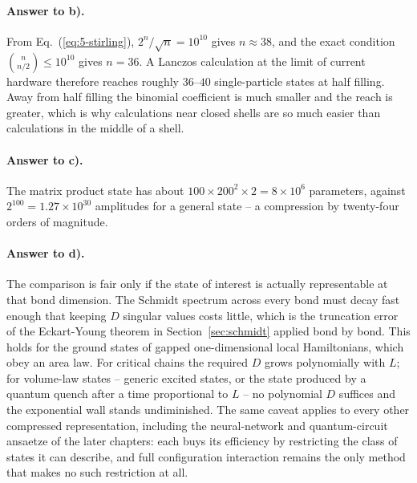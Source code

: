 \paragraph{Answer to b).}
From Eq.~(\ref{eq:5-stirling}), $2^{n}/\sqrt{n}=10^{10}$ gives $n\approx38$,
and the exact condition $\binom{n}{n/2}\le10^{10}$ gives $n=36$.  A Lanczos
calculation at the limit of current hardware therefore reaches roughly
$36$--$40$ single-particle states at half filling.  Away from half filling the
binomial coefficient is much smaller and the reach is greater, which is why
calculations near closed shells are so much easier than calculations in the
middle of a shell.

\paragraph{Answer to c).}
The matrix product state has about $100\times200^2\times2=8\times10^{6}$
parameters, against $2^{100}=1.27\times10^{30}$ amplitudes for a general
state -- a compression by twenty-four orders of magnitude.

\paragraph{Answer to d).}
The comparison is fair only if the state of interest is actually representable
at that bond dimension.  The Schmidt spectrum across every bond must decay
fast enough that keeping $D$ singular values costs little, which is the
truncation error of the Eckart-Young theorem in
Section~\ref{sec:schmidt} applied bond by bond.  This holds for the ground
states of gapped one-dimensional local Hamiltonians, which obey an area law.
For critical chains the required $D$ grows polynomially with $L$; for
volume-law states -- generic excited states, or the state produced by a
quantum quench after a time proportional to $L$ -- no polynomial $D$
suffices and the exponential wall stands undiminished.  The same caveat
applies to every other compressed representation, including the
neural-network and quantum-circuit ansaetze of the later chapters: each buys
its efficiency by restricting the class of states it can describe, and full
configuration interaction remains the only method that makes no such
restriction at all.
